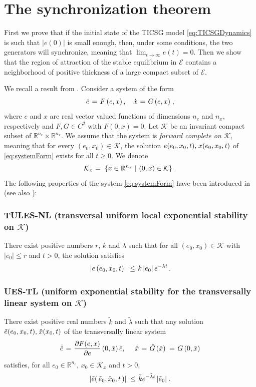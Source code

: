 \documentclass[letterpaper,10pt,conference]{ieeeconf}
\newcommand{\rline}  {{\mathbb R}}
\renewcommand{\l}    {{\lambda}}
\newcommand{\m}      {{\hbox{\hskip 1pt}}}
\newcommand{\Emscr}  {{\mathcal{E}}}
\newcommand{\Kmscr}  {{\mathcal{K}}}
\begin{document}
\section{The synchronization theorem} \label{sec6} %
 
First we prove that if the initial state of the TICSG model
\eqref{eq:TICSGDynamics} is such that $|e(0)|$ is small enough, then,
under some conditions, the two generators will synchronize, meaning
that $\lim_{t\to\infty}e(t)=0$. Then we show that the region of
attraction of the stable equilibrium in $\Emscr$ contains a
neighborhood of positive thickness of a large compact subset of 
$\Emscr$.

We recall a result from \cite{AndrieuJayawardhanaPraly,AJP_2016}. 
Consider a system of the form
\begin{equation} \label{eq:systemForm}
   \dot{e} \m=\m F\left(e,x\right),\quad \dot{x} \m=\m
   G\left(e,x\right) \m,
\end{equation}
where $e$ and $x$ are real vector valued functions of dimensions $n_e$ 
and $n_x$, respectively and $F,G\in C^2$ with $F(0,x)=0$. Let $\Kmscr$
be an invariant compact subset of $\rline^{n_e}\times\rline^{n_x}$. We
assume that the system is {\em forward complete on} $\Kmscr$, meaning
that for every $(e_0,x_0)\in\Kmscr$, the solution $e(e_0,x_0,t),\m 
x(e_0,x_0,t)$ of \eqref{eq:systemForm} exists for all $t\geq 0$. We 
denote 
$$ \Kmscr_x \m=\m \left\{x\in\rline^{n_x}\ |\ (0,x)\in\Kmscr \right\}
   \m.$$
The following properties of the system \eqref{eq:systemForm} have been
introduced in \cite{AndrieuJayawardhanaPraly} (see also 
\cite{AJP_2016}):

\subsubsection{TULES-NL (transversal uniform local exponential
stability on $\Kmscr$)} There exist positive numbers $r$, $k$ and $\l$
such that for all $(e_0,x_0)\in\Kmscr$ with $\left|e_0\right|\leq r$
and $t>0$, the solution satisfies
$$ \left|e\left(e_0,x_0,t\right)\right| \m\leq\m k\left|e_0\right| 
   e^{-\l t} \m.$$ 

\subsubsection{UES-TL (uniform exponential stability for the 
transversally linear system on $\Kmscr$)} There exist positive real 
numbers $\tilde{k}$ and $\tilde{\l}$ such that any solution $\tilde e
(e_0,x_0,t),\m\tilde x(x_0,t)$ of the transversally linear system
$$ \dot{\tilde{e}} \m=\m \frac{\partial F(e,x)}{\partial e} \left(0,
   \tilde{x}\right)\tilde e,\quad\ \dot{\tilde{x}} \m=\m \tilde{G}
   \left(\tilde{x}\right) \m=\m G\left(0,\tilde x\right)$$
satisfies, for all $e_0\in\rline^{n_e}$, $x_0\in\Kmscr_x$ and $t>0$,
$$ \left| \tilde{e}\right(\tilde{e}_0,\tilde{x}_0,t \left) \right| 
   \m\leq\m \tilde{k} e^{-\tilde\l t}\left| \tilde{e}_0\right| \m.$$ 
\end{document}
